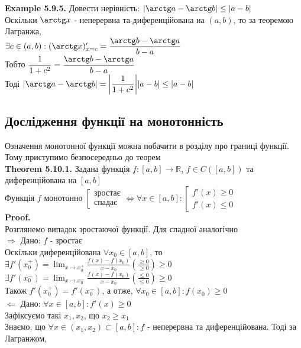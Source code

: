 \documentclass[a4paper, 14pt]{extarticle}
\def\huge{\displaystyle}
\def\bigline{\vspace{5mm}\\}
\def\ex#1{\textbf{Example {#1}}}
\def\th#1{\textbf{Theorem {#1}}}
\def\proof{\textbf{Proof.}\\}
\def\bigline{\vspace{5mm}\\}
\begin{document}
\ex{5.9.5.} Довести нерівність: $|\arctg a - \arctg b| \leq |a-b|$\\
Оскільки $\arctg x$ - неперервна та диференційована на $(a,b)$, то за теоремою Лагранжа,\\
$\exists c \in (a,b): (\arctg x)'_{x = c} = \dfrac{\arctg b - \arctg a}{b-a}$\\
Тобто $\dfrac{1}{1+c^2} =\dfrac{\arctg b - \arctg a}{b-a}$\\
Тоді $|\arctg a - \arctg b| = \abs{\dfrac{1}{1+c^2}} |a-b| \leq |a-b|$

\subsection{Дослідження функції на монотонність}
Означення монотонної функції можна побачити в розділу про границі функції. Тому приступимо безпосередньо до теорем\\
\th{5.10.1.} Задана функція $f: [a,b] \to \mathbb{R}$, $f \in C([a,b])$ та диференційована на $[a,b]$\\
Функція $f$ монотонно $\left[ \begin{gathered} \textrm{зростає} \\ \textrm{спадає} \end{gathered} \right. \iff \forall x \in [a,b]: \left[ \begin{gathered} f'(x) \geq 0 \\ f'(x) \leq 0 \end{gathered} \right.$\\
\proof
Розглянемо випадок зростаючої функції. Для спадної аналогічно\\
$\boxed{\Rightarrow}$ Дано: $f$ - зростає\\
Оскільки диференційована $\forall x_0 \in [a,b]$, то \\ 
$\exists f'(x_0^+) = \huge \lim_{x \to x_0^+} \frac{f(x)-f(x_0)}{x-x_0} \left( \frac{\geq 0}{\geq 0} \right) \geq 0$\\
$\exists f'(x_0^-) = \huge \lim_{x \to x_0^-} \frac{f(x)-f(x_0)}{x-x_0} \left( \frac{\leq 0}{\leq 0} \right) \geq 0$\\
Також $f'(x_0^+) = f'(x_0^-)$, а отже, $\forall x_0 \in [a,b]: f(x_0) \geq 0$
\bigline
$\boxed{\Leftarrow}$ Дано: $\forall x \in [a,b]: f'(x) \geq 0$\\
Зафіксуємо такі $x_1,x_2$, що $x_2 \geq x_1$\\
Знаємо, що $\forall x \in (x_1,x_2) \subset [a,b]: f$ - неперервна та диференційована. Тоді за Лагранжом,\\
\end{document}

